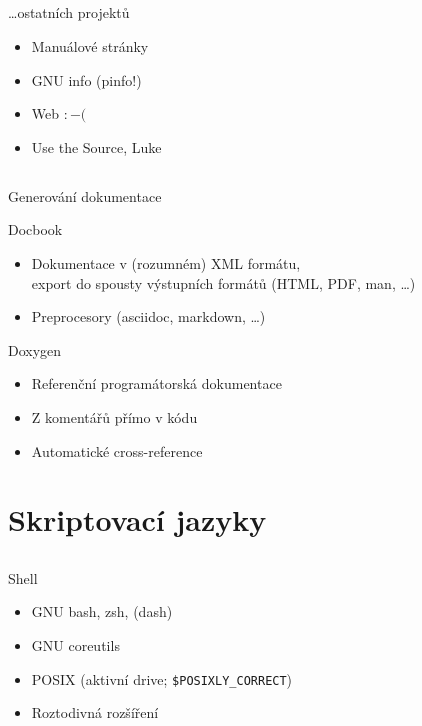\documentclass{beamer}
\begin{document}
\subsection{}
\begin{frame}{\dots ostatních projektů}
\begin{itemize}
\item Manuálové stránky
\item GNU info (pinfo!)
\item Web $:-($
\item Use the Source, Luke
\end{itemize}
\end{frame}

\subsection{}
\begin{frame}{Generování dokumentace}
\begin{center}
\begin{block}{Docbook}
\begin{itemize}
\item Dokumentace v (rozumném) XML formátu, \\ export do spousty výstupních formátů (HTML, PDF, man, \dots)
\item Preprocesory (asciidoc, markdown, \dots)
\end{itemize}
\end{block}
\begin{block}{Doxygen}
\begin{itemize}
\item Referenční programátorská dokumentace
\item Z komentářů přímo v kódu
\item Automatické cross-reference
\end{itemize}
\end{block}
\end{center}
\end{frame}


\section{Skriptovací jazyky}

\subsection{}
\begin{frame}{Shell}
\begin{itemize}
\item GNU bash, zsh, (dash)
\item GNU coreutils
\item POSIX (aktivní drive; {\tt \$POSIXLY\_CORRECT})
\item Roztodivná rozšíření
\end{itemize}
\end{frame}
\end{document}
